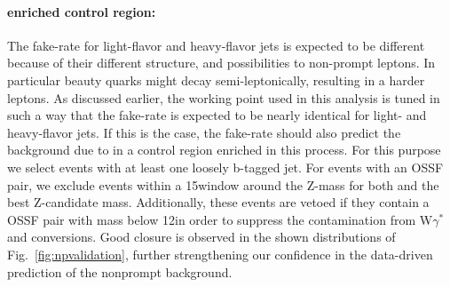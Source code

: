 \paragraph{\texorpdfstring{\ttbar}{ttbar} enriched control region:}
The fake-rate for light-flavor and heavy-flavor jets is expected to be
different because of their different structure, and possibilities to
non-prompt leptons. In particular beauty quarks might decay
semi-leptonically, resulting in a harder leptons. As discussed earlier, the \fo working point used in this analysis is tuned in such a way that the fake-rate is expected to be nearly identical for light- and heavy-flavor jets. If this is the case, the fake-rate should also predict the background due to \ttbar  in a control region enriched in this process.
For this purpose we select events with at least one loosely b-tagged jet. 
For events with an OSSF pair, we exclude events within a 15\GeV window around the Z-mass for both \mlll  and the best Z-candidate mass. Additionally, these events are vetoed if they contain a \lo OSSF pair with mass below 12\GeV in order to suppress the contamination from W$\gamma^{*}$ and conversions. Good closure is observed in the shown distributions of Fig.~\ref{fig:npvalidation}, further strengthening our confidence in the data-driven prediction of the nonprompt background.

